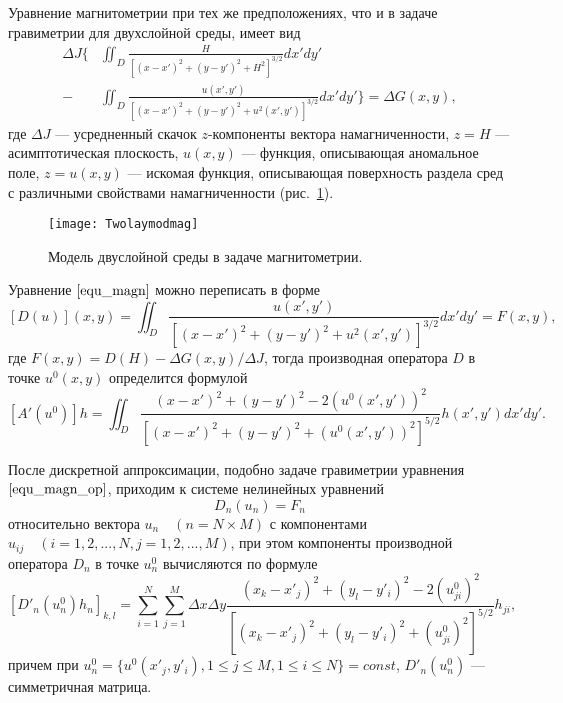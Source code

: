 Уравнение магнитометрии при тех же предположениях, что и в задаче гравиметрии для двухслойной среды, имеет вид
\begin{equation}\label{equ_magn}\begin{aligned}
\Delta J  \bigg\{&\iint_{D} \frac{H}{[(x-x')^2+(y-y')^2+H^2]^{3/2}}dx'dy' \\
- &\iint_{D} \frac{u(x',y')}{[(x-x')^2+(y-y')^2+u^2(x',y')]^{3/2}}dx'dy' \bigg\}=\Delta G(x,y),
\end{aligned} \end{equation}
где $\Delta J$ --- усредненный скачок $z$-компоненты вектора намагниченности, $z=H$ --- асимптотическая плоскость, $u(x,y)$ --- функция, описывающая аномальное поле, $z=u(x,y)$ --- искомая функция, описывающая поверхность раздела сред с различными свойствами намагниченности (рис.~\ref{fig:twolayermag}). 
\begin{figure}[H]
	\centering
	\texttt{[image: Twolaymodmag]}
	\caption{Модель двуслойной среды в задаче магнитометрии.}
	\label{fig:twolayermag}
\end{figure}
Уравнение $\eqref{equ_magn}$ можно переписать в форме
\begin{equation}\label{equ_magn_op}
[D(u)](x,y)= \iint_{D} \frac{u(x',y')}{[(x-x')^2+(y-y')^2+u^2(x',y')]^{3/2}}dx'dy'=F(x,y),
\end{equation}
где $F(x,y)=D(H)-\Delta G(x,y)/\Delta J$, тогда производная оператора $D$ в точке $u^0(x,y)$ определится формулой
$$ [A'(u^0)]h=\iint_{D} \frac{(x-x')^2+(y-y')^2-2(u^0(x',y'))^2}{[(x-x')^2+(y-y')^2+(u^0(x',y'))^2]^{5/2}}h(x',y')dx'dy'. $$

После дискретной аппроксимации, подобно задаче гравиметрии уравнения $\eqref{equ_magn_op}$, приходим к системе нелинейных уравнений
\begin{equation}\label{equ_snle_mag}
D_n(u_n)=F_n
\end{equation}
относительно вектора $u_n \quad (n=N\times M)$ с компонентами $u_{ij}\quad (i=1,2,...,N, j=1,2,...,M)$, при этом компоненты производной оператора $D_n$ в точке $u_{n}^{0}$ вычисляются по формуле
\begin{equation}\label{deriv_op_mag}
[D'_n(u_{n}^{0})h_n]_{k,l}=\sum\limits_{i=1}^{N}\sum\limits_{j=1}^{M}
\Delta x\Delta y\frac{(x_k-x'_j)^2+(y_l-y'_i)^2-2(u_{ji}^0)^2}{[(x_k-x'_j)^2+(y_l-y'_i)^2+(u_{ji}^0)^2]^{5/2}}h_{ji}, 
\end{equation}
причем при $u_{n}^{0}=\{u^0(x'_j, y'_i), 1\le j\le M, 1\le i\le N\}=const$, $D'_n(u_n^0)$ --- симметричная матрица.

